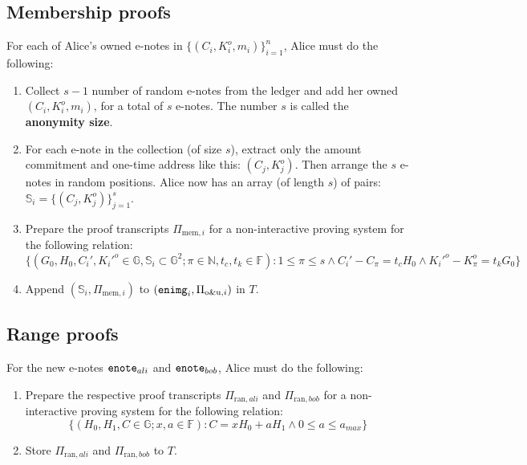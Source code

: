 \documentclass{article}
\begin{document}
\subsection{Membership proofs}
For each of Alice's owned e-notes in $\{(C_i,K_i^o,m_i)\}_{i=1}^n$, Alice must do the following:
\begin{enumerate}
    \item Collect $s-1$ number of random e-notes from the ledger and add her owned $(C_i,K_i^o,m_i)$, for a total of $s$ e-notes. The number $s$ is called the \textbf{anonymity size}.
    \item For each e-note in the collection (of size $s$), extract only the amount commitment and one-time address like this: $(C_j, K_j^o)$. Then arrange the $s$ e-notes in random positions. Alice now has an array (of length $s$) of pairs: $\mathbb{S}_i = \{(C_j, K_j^o)\}_{j=1}^s$.
    \item Prepare the proof transcripts $\Pi_{\text{mem}, i}$ for a non-interactive proving system for the following relation:
$$\{(G_0, H_0, C_i', K_i'^o \in\mathbb{G}, \mathbb{S}_i\subset\mathbb{G}^2; \pi\in\mathbb{N}, t_c, t_k\in\mathbb{F}): 1\le\pi\le s \wedge C_i' - C_\pi = t_c H_0 \wedge K_i'^o - K_\pi^o = t_k G_0 \}$$
    \item Append $(\mathbb{S}_i, \Pi_{\text{mem}, i})$ to $({\tt enimg}_i, \Pi_{\text{o\&u}, i})$ in $T$.
\end{enumerate}

\subsection{Range proofs}
For the new e-notes ${\tt enote}_{ali}$ and ${\tt enote}_{bob}$, Alice must do the following:
\begin{enumerate}
    \item Prepare the respective proof transcripts $\Pi_{\text{ran}, ali}$ and $\Pi_{\text{ran}, bob}$ for a non-interactive proving system for the following relation:
$$\{(H_0, H_1, C \in\mathbb{G}; x, a\in\mathbb{F}): C = x H_0 + a H_1 \wedge 0\le a \le a_{max}\}$$
    \item Store $\Pi_{\text{ran}, ali}$ and $\Pi_{\text{ran}, bob}$ to $T$.
\end{enumerate}
\end{document}
